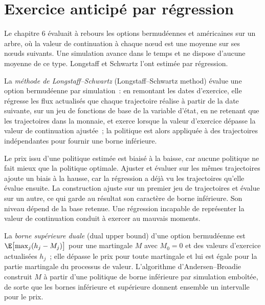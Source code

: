 \section{Exercice anticipé par régression}

Le chapitre 6 évaluait à rebours les options bermudéennes et américaines sur un arbre, où la valeur de continuation à chaque nœud est une moyenne sur ses
nœuds suivants. Une simulation avance dans le temps et ne dispose d'aucune moyenne de ce type. Longstaff et Schwartz l'ont estimée par régression.

\begin{definition}\label{def:dv:monte-carlo-pricers-in-practice:lsm}
La \emph{méthode de Longstaff--Schwartz} (Longstaff--Schwartz method) évalue une option bermudéenne par simulation~: en remontant les
dates d'exercice, elle régresse les flux actualisés que chaque trajectoire réalise à partir de la date suivante, sur un jeu de fonctions de base de la
variable d'état, en ne retenant que les trajectoires dans la monnaie, et exerce lorsque la valeur d'exercice dépasse la valeur de continuation ajustée~; la politique est alors
appliquée à des trajectoires indépendantes pour fournir une borne inférieure.
\end{definition}

Le prix issu d'une politique estimée est biaisé à la baisse, car aucune politique ne fait mieux que la politique optimale. Ajuster et évaluer sur les mêmes trajectoires ajoute un
biais à la hausse, car la régression a déjà vu les trajectoires qu'elle évalue ensuite. La construction ajuste sur un premier jeu de trajectoires et évalue sur un autre, ce qui garde au résultat son
caractère de borne inférieure. Son niveau dépend de la base retenue. Une régression incapable de représenter la valeur de continuation conduit à exercer au
mauvais moments.

\begin{definition}\label{def:dv:monte-carlo-pricers-in-practice:dual}
La \emph{borne supérieure duale} (dual upper bound) d'une option bermudéenne est $\E\bigl[\max_j(h_j-M_j)\bigr]$ pour une martingale $M$ avec $M_0=0$
et des valeurs d'exercice actualisées $h_j$~; elle dépasse le prix pour toute martingale et lui est égale pour la partie martingale
du processus de valeur. L'algorithme d'Andersen--Broadie construit $M$ à partir d'une politique de borne inférieure par simulation emboîtée, de sorte que les
bornes inférieure et supérieure donnent ensemble un intervalle pour le prix.
\end{definition}

